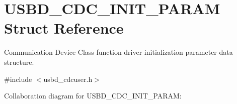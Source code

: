 \hypertarget{structUSBD__CDC__INIT__PARAM}{}\section{U\+S\+B\+D\+\_\+\+C\+D\+C\+\_\+\+I\+N\+I\+T\+\_\+\+P\+A\+R\+AM Struct Reference}
\label{structUSBD__CDC__INIT__PARAM}


Communication Device Class function driver initialization parameter data structure.  




{\ttfamily \#include $<$usbd\+\_\+cdcuser.\+h$>$}



Collaboration diagram for U\+S\+B\+D\+\_\+\+C\+D\+C\+\_\+\+I\+N\+I\+T\+\_\+\+P\+A\+R\+AM\+:
